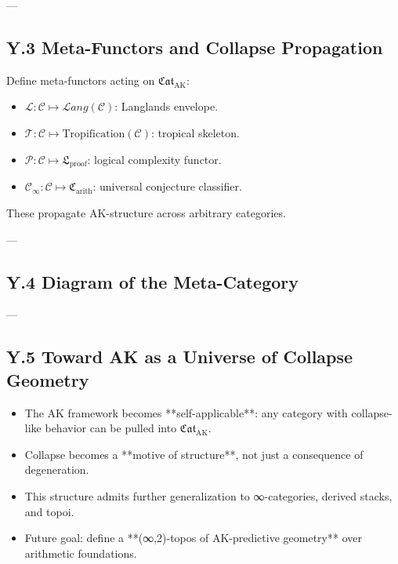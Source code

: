 \documentclass[11pt]{article}
\begin{document}
---

\subsection*{Y.3 Meta-Functors and Collapse Propagation}

Define meta-functors acting on \( \mathfrak{Cat}_{\mathrm{AK}} \):

\begin{itemize}
  \item \( \mathscr{L} : \mathcal{C} \mapsto \mathcal{L}ang(\mathcal{C}) \): Langlands envelope.
  \item \( \mathscr{T} : \mathcal{C} \mapsto \mathrm{Tropification}(\mathcal{C}) \): tropical skeleton.
  \item \( \mathscr{P} : \mathcal{C} \mapsto \mathfrak{L}_{\mathrm{proof}} \): logical complexity functor.
  \item \( \mathscr{C}_\infty : \mathcal{C} \mapsto \mathfrak{C}_{\mathrm{arith}} \): universal conjecture classifier.
\end{itemize}

These propagate AK-structure across arbitrary categories.

---

\subsection*{Y.4 Diagram of the Meta-Category}

\vspace{1em}
\begin{center}
\end{center}
\vspace{1em}

---

\subsection*{Y.5 Toward AK as a Universe of Collapse Geometry}

\begin{itemize}
  \item The AK framework becomes **self-applicable**: any category with collapse-like behavior can be pulled into \( \mathfrak{Cat}_{\mathrm{AK}} \).
  \item Collapse becomes a **motive of structure**, not just a consequence of degeneration.
  \item This structure admits further generalization to ∞-categories, derived stacks, and topoi.
  \item Future goal: define a **(∞,2)-topos of AK-predictive geometry** over arithmetic foundations.
\end{itemize}
\end{document}
